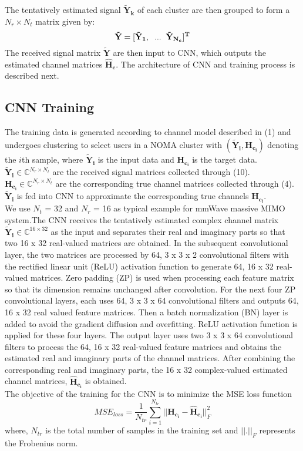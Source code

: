 \documentclass[journal]{IEEEtran}
\begin{document}
The tentatively estimated signal $\mathbf{\tilde{Y}_k}$ of each cluster are then grouped to form a $N_r \times N_t$ matrix given by:
\begin{equation}
\mathbf{\tilde Y = [\tilde{Y}_1,\hspace{0.2cm}...\hspace{0.2cm}\tilde{Y}_{N_c}]^T}
\end{equation}
The received signal matrix $\mathbf{\tilde Y}$ are then input to CNN, which outputs the estimated channel matrices $\mathbf{\hat H_c}$. The architecture of CNN and training process is described next.

\subsection{CNN Training}
The training data is generated according to channel model described in (1) and undergoes clustering to select users in a NOMA cluster with $(\mathbf{\tilde{Y}_i,H_{c_i}})$ denoting the $i$th sample, where $\mathbf{\tilde{Y}_i}$ is the input data and $\mathbf{H_{c_i}}$ is the target data.
$\mathbf{\tilde{Y}_i} \in \mathbb{C}^{N_r \times N_t}$ are the received signal matrices collected through (10). $\mathbf{H_{c_i}} \in \mathbb{C}^{N_r \times N_t}$ are the corresponding true channel matrices collected through (4). $\mathbf{\tilde{Y}_i}$ is fed into CNN to approximate the corresponding true channels $\mathbf{H_{c_i}}$.\\
We use $N_t$ = 32 and $N_r$ = 16 as typical example for mmWave massive MIMO system.The CNN receives the tentatively estimated complex channel
matrix $\mathbf{\tilde{Y}_i} \in \mathbb{C}^{16 \times 32}$ as the input and separates their real and imaginary parts so that two 16 x 32 real-valued matrices are obtained. In the subsequent convolutional layer, the two matrices are processed by 64, 3 x 3 x 2 convolutional filters with the rectified linear unit
(ReLU) activation function to generate 64, 16 x 32 real-valued
matrices. Zero padding (ZP) is used when processing each
feature matrix so that its dimension remains unchanged
after convolution. For the
next four ZP convolutional layers, each uses 64, 3 x 3 x 64 convolutional filters and outputs 64, 16 x 32 real valued feature matrices. Then a batch normalization (BN) layer is added to avoid the gradient diffusion and overfitting. ReLU activation function is applied
for these four layers. The output layer uses two 3 x 3 x 64 convolutional filters to process the 64, 16 x 32 real-valued feature matrices and obtains the estimated real and imaginary parts of the channel matrices. After 
combining the corresponding real and imaginary parts, the
16 x 32 complex-valued estimated channel matrices, $\mathbf{\hat H_{c_i}}$ is obtained.\\ 
The objective of the training for the CNN is to minimize the MSE loss function
\begin{equation}
{MSE}_{loss} = \frac{1}{N_{tr}} \sum_{i = 1}^{N_{tr}}||\mathbf{H_{c_i} - \hat{H}_{c_i}}||^2_F
\end{equation}
where, $N_{tr}$ is the total number of samples in the training set and $||.||_F$ represents the Frobenius norm. \\
\end{document}
